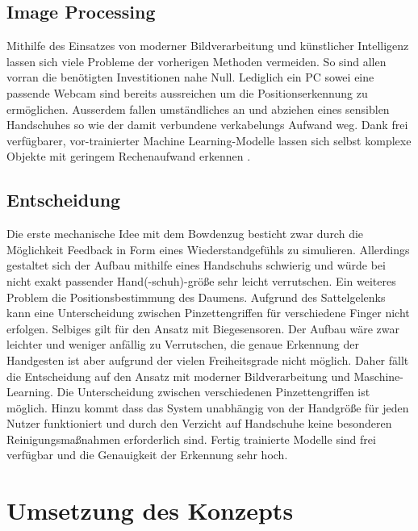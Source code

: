 \documentclass[a4paper,12pt,final]{article} %
\numberwithin{equation}{section} %
\numberwithin{figure}{section} %
\numberwithin{table}{section} %
\begin{document}
\subsection{Image Processing}
Mithilfe des Einsatzes von moderner Bildverarbeitung und künstlicher Intelligenz lassen sich viele Probleme der vorherigen Methoden vermeiden. So sind allen vorran die benötigten Investitionen nahe Null. Lediglich ein PC sowei eine passende Webcam sind bereits aussreichen um die Positionserkennung zu ermöglichen. Ausserdem fallen um\-ständ\-liches an und abziehen eines sensiblen Handschuhes so wie der damit verbundene verkabelungs Aufwand weg. Dank frei verfügbarer, vor-trainierter Machine Learning-Modelle lassen sich selbst komplexe Objekte mit geringem Rechenaufwand erkennen \cite{MediaPipe}. 


\subsection{Entscheidung}

Die erste mechanische Idee mit dem Bowdenzug besticht zwar durch die Möglichkeit Feedback in Form eines Wiederstandgefühls zu simulieren. Allerdings gestaltet sich der Aufbau mithilfe eines Handschuhs schwierig und würde bei nicht exakt passender Hand(-schuh)-größe sehr leicht verrutschen. Ein weiteres Problem die Positionsbestimmung des Daumens. Aufgrund des Sattelgelenks kann eine Unterscheidung zwischen Pinzetten\-griffen für verschiedene Finger nicht erfolgen. Selbiges gilt für den Ansatz mit Biege\-sensoren. Der Aufbau wäre zwar leichter und weniger anfällig zu Verrutschen, die genaue Erkennung der Handgesten ist aber aufgrund der vielen Freiheitsgrade nicht möglich.
Daher fällt die Entscheidung auf den Ansatz mit moderner Bildverarbeitung und Maschine-Learning. Die Unterscheidung zwischen verschiedenen Pinzettengriffen ist möglich. Hinzu kommt dass das System unabhängig von der Handgröße für jeden Nutzer funktioniert und durch den Verzicht auf Handschuhe keine besonderen Reinigungsmaßnahmen erforderlich sind. Fertig trainierte Modelle sind frei verfügbar und die Genauigkeit der Erkennung sehr hoch.


\newpage
\section{Umsetzung des Konzepts}
\end{document}
